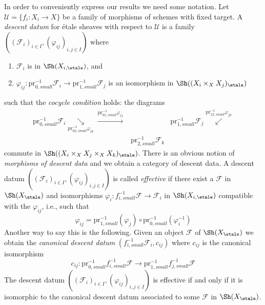 \medskip\noindent
In order to conveniently express our results we need some notation.
Let $\mathcal{U} = \{f_i : X_i \to X\}$
be a family of morphisms of schemes with fixed target.
A {\it descent datum} for \'etale sheaves with respect to
$\mathcal{U}$ is a family
$((\mathcal{F}_i)_{i \in I}, (\varphi_{ij})_{i, j \in I})$ where
\begin{enumerate}
\item $\mathcal{F}_i$ is in $\Sh(X_{i, \etale})$, and
\item $\varphi_{ij} :
\text{pr}_{0, small}^{-1} \mathcal{F}_i
\longrightarrow
\text{pr}_{1, small}^{-1} \mathcal{F}_j$
is an isomorphism in $\Sh((X_i \times_X X_j)_\etale)$
\end{enumerate}
such that the {\it cocycle condition} holds: the diagrams
$$
\begin{array}{ccc}\text{pr}_{0, small}^{-1}\mathcal{F}_i
\underset{\text{pr}_{02, small}^{-1}\varphi_{ik}}{\searrow}\overset{\text{pr}_{01, small}^{-1}\varphi_{ij}}{\longrightarrow} &  & \text{pr}_{1, small}^{-1}\mathcal{F}_j
\overset{\text{pr}_{12, small}^{-1}\varphi_{jk}}{\swarrow} \\  & \text{pr}_{2, small}^{-1}\mathcal{F}_k & \end{array}
$$
commute in $\Sh((X_i \times_X X_j \times_X X_k)_\etale)$.
There is an obvious notion of {\it morphisms of descent data}
and we obtain a category of descent data.
A descent datum
$((\mathcal{F}_i)_{i \in I}, (\varphi_{ij})_{i, j \in I})$
is called {\it effective} if there exist a
$\mathcal{F}$ in $\Sh(X_\etale)$ and isomorphisms
$\varphi_i : f_{i, small}^{-1} \mathcal{F} \to \mathcal{F}_i$
in $\Sh(X_{i, \etale})$ compatible with the $\varphi_{ij}$, i.e.,
such that
$$
\varphi_{ij} =
\text{pr}_{1, small}^{-1} (\varphi_j) \circ
\text{pr}_{0, small}^{-1} (\varphi_i^{-1})
$$
Another way to say this is the following. Given an object $\mathcal{F}$
of $\Sh(X_\etale)$ we obtain the {\it canonical descent datum}
$(f_{i, small}^{-1}\mathcal{F}_i, c_{ij})$ where $c_{ij}$
is the canonical isomorphism
$$
c_{ij} : \text{pr}_{0, small}^{-1} f_{i, small}^{-1}\mathcal{F}
\longrightarrow
\text{pr}_{1, small}^{-1} f_{j, small}^{-1}\mathcal{F}
$$
The descent datum
$((\mathcal{F}_i)_{i \in I}, (\varphi_{ij})_{i, j \in I})$
is effective if and only if it is isomorphic to the canonical
descent datum associated to some $\mathcal{F}$ in $\Sh(X_\etale)$.

